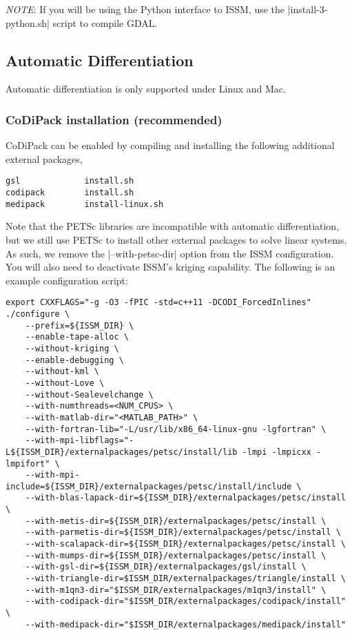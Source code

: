 \emph{NOTE}:
If you will be using the Python interface to ISSM, use the \lstinlinebg|install-3-python.sh| script to compile GDAL.

\subsection{Automatic Differentiation}
Automatic differentiation is only supported under Linux and Mac. 

\subsubsection{CoDiPack installation (recommended)}
CoDiPack can be enabled by compiling and installing the following additional external packages,

\begin{lstlisting}
gsl				install.sh
codipack		install.sh
medipack		install-linux.sh
\end{lstlisting}

Note that the PETSc libraries are incompatible with automatic differentiation, but we still use PETSc to install other external packages to solve linear systems. As such, we remove the \lstinlinebg|--with-petsc-dir| option from the ISSM configuration. You will also need to deactivate
ISSM's kriging capability. The following is an example configuration script:

\begin{lstlisting}
export CXXFLAGS="-g -O3 -fPIC -std=c++11 -DCODI_ForcedInlines"
./configure \
	--prefix=${ISSM_DIR} \
	--enable-tape-alloc \
	--without-kriging \
	--enable-debugging \
	--without-kml \
	--without-Love \
	--without-Sealevelchange \
	--with-numthreads=<NUM_CPUS> \
	--with-matlab-dir="<MATLAB_PATH>" \
	--with-fortran-lib="-L/usr/lib/x86_64-linux-gnu -lgfortran" \
	--with-mpi-libflags="-L${ISSM_DIR}/externalpackages/petsc/install/lib -lmpi -lmpicxx -lmpifort" \
	--with-mpi-include=${ISSM_DIR}/externalpackages/petsc/install/include \
	--with-blas-lapack-dir=${ISSM_DIR}/externalpackages/petsc/install \
	--with-metis-dir=${ISSM_DIR}/externalpackages/petsc/install \
	--with-parmetis-dir=${ISSM_DIR}/externalpackages/petsc/install \
	--with-scalapack-dir=${ISSM_DIR}/externalpackages/petsc/install \
	--with-mumps-dir=${ISSM_DIR}/externalpackages/petsc/install \
	--with-gsl-dir=${ISSM_DIR}/externalpackages/gsl/install \
	--with-triangle-dir=$ISSM_DIR/externalpackages/triangle/install \
	--with-m1qn3-dir="$ISSM_DIR/externalpackages/m1qn3/install" \
	--with-codipack-dir="$ISSM_DIR/externalpackages/codipack/install" \
	--with-medipack-dir="$ISSM_DIR/externalpackages/medipack/install"
\end{lstlisting}

